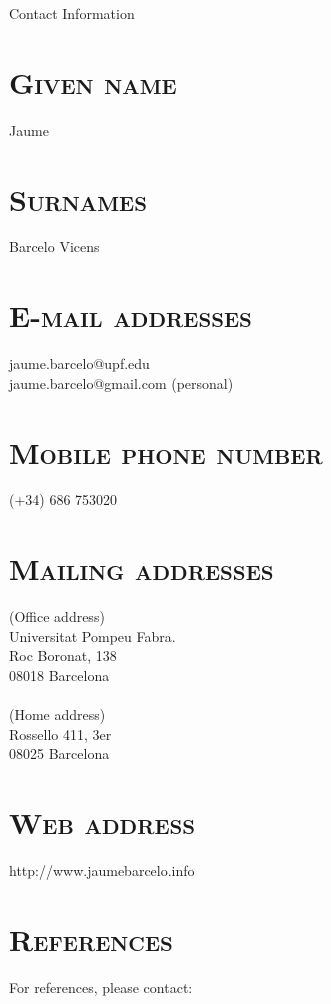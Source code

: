\documentclass[line,margin]{res}
\begin{document}
{\huge Contact Information}

\section{\textsc{Given name}}
Jaume

\section{\textsc{Surnames}}
Barcelo Vicens

%
%
\section{\textsc{E-mail addresses}}
jaume.barcelo@upf.edu \\
jaume.barcelo@gmail.com (personal)

\section{\textsc{Mobile phone number}}
(+34) 686 753020 \\

\section{\textsc{Mailing addresses}}
%
(Office address) \\
Universitat Pompeu Fabra.\\
Roc Boronat, 138\\
08018 Barcelona\\
 \\
(Home address) \\
Rossello 411, 3er\\
08025 Barcelona\\

\section{\textsc{Web address}}
http://www.jaumebarcelo.info

\section{\textsc{References}}
For references, please contact:
\end{document}
